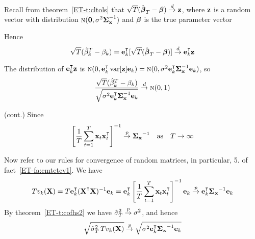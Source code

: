\begin{frame}

    \vspace{2em}
    \Prf 
    Recall from theorem~\ref{ET-t:cltols} that 
   $\sqrt{T} (\hat {\boldsymbol \beta}_T - {\boldsymbol \beta}) \stackrel { d } {\to} {\mathbf z}$, where ${\mathbf z}$ is a random vector with distribution
    $\textrm{\sc n}({\mathbf 0}, \sigma^2 {\boldsymbol \Sigma_{{\mathbf x}}^{-1}})$
    and ${\boldsymbol \beta}$ is the true parameter vector
    
    \vspace{.7em}
    Hence
    \begin{equation*}
        \sqrt{T} (\hat \beta_k^T - \beta_k)
        = \bolde_k^\T [\sqrt{T} (\hboldbeta_T - \boldbeta)] \tod 
        \bolde_k^\T \boldz 
    \end{equation*}
    
    \vspace{.7em}
    The distribution of $\bolde_k^\T \boldz$ is 
    $\nN(0, \bolde_k^\T \var[\boldz] \bolde_k)
    = \nN(0, \sigma^2 \bolde_k^\T \Sigmaxinv \bolde_k)$, so
    \begin{equation}
        \label{eq:tscno}
        \frac{\sqrt{T} (\hat \beta_k^T - \beta_k)}
                {\sqrt{\sigma^2 \bolde_k^\T \Sigmaxinv \bolde_k}}
        \tod \nN(0, 1)
    \end{equation}
    
\end{frame}

\begin{frame}

    \vspace{2em}
    \Prf (cont.)
    Since 
    \begin{equation*}
    \left[ \frac{1}{T} \sum_{t=1}^T \boldx_t \boldx_t^\T \right]^{-1} \toprob \Sigmax^{-1}
    \quad \text{as} \quad
    T \to \infty
    \end{equation*}
    
    Now refer to our rules for convergence of random matrices, in particular, 5. of fact~\ref{ET-fa:cmtetcv1}. We have
    \begin{equation*}
        T v_k (\boldX)
        = 
        T \bolde_k^\T 
            (\boldX^\T\boldX)^{-1}
        \bolde_k
        =
        \bolde_k^\T 
            \left[ \frac{1}{T} \sum_{t=1}^T \boldx_t \boldx_t^\T \right]^{-1}
        \bolde_k
        \toprob \bolde_k^\T \Sigmax^{-1} \bolde_k
    \end{equation*}
    By theorem~\ref{ET-t:cofhs2} we have $\hat \sigma_T^2 \stackrel { p } {\to} \sigma^2$, and
    hence
    \begin{equation*}
        \sqrt{ \hat \sigma_T^2 \, T v_k(\boldX) }
        \toprob 
        \sqrt{ \sigma^2 \bolde_k^\T \Sigmax^{-1} \bolde_k }
    \end{equation*}

\end{frame}

